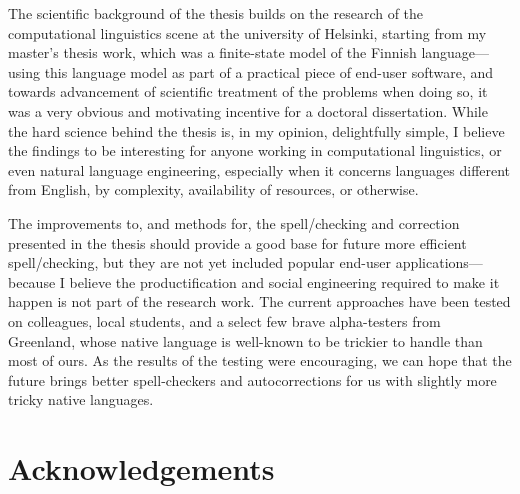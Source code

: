 \documentclass[officiallayout]{unihelcompling}
\begin{document}
The scientific background of the thesis builds on the research of the
computational linguistics scene at the university of Helsinki, starting from my
master's thesis work, which was a finite-state model of the Finnish
language---using this language model as part of a practical piece of end-user
software, and towards advancement of scientific treatment of the problems
when doing so, it was a very obvious and motivating incentive for a doctoral
dissertation. While the hard science behind the thesis is, in my opinion,
delightfully simple, I believe the findings to be interesting for anyone
working in computational linguistics, or even natural language engineering,
especially when it concerns languages different from English, by complexity,
availability of resources, or otherwise.

The improvements to, and methods for, the spell\-/checking and correction
presented in the thesis should provide a good base for future more efficient
spell\-/checking, but they are not yet included popular end-user applications---
because I believe the productification and social engineering required to make
it happen is not part of the research work. The current approaches have been
tested on colleagues, local students, and a select few brave alpha-testers from
Greenland, whose native language is well-known to be trickier to handle than
most of ours. As the results of the testing were encouraging, we can hope that
the future brings better spell-checkers and autocorrections for us with
slightly more tricky native languages.

\section*{Acknowledgements}
\label{sec:acknowledgements}
\end{document}
